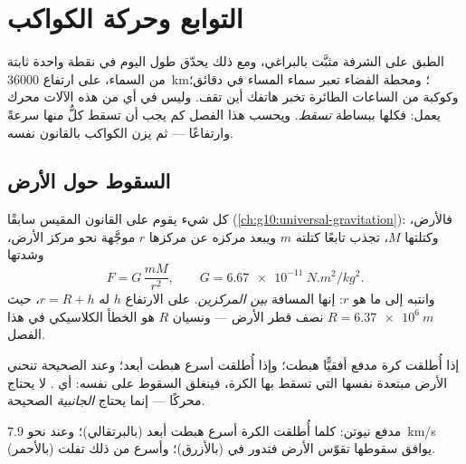 \chapter{التوابع وحركة الكواكب}\label{ch:g12:satellites-kepler}

الطبق على الشرفة مثبَّت بالبراغي، ومع ذلك يحدّق طول اليوم في نقطة
واحدة ثابتة من السماء، على ارتفاع \qty{36000}{km}؛ ومحطة الفضاء
تعبر سماء المساء في دقائق؛ وكوكبة من الساعات الطائرة
تخبر هاتفك أين تقف. وليس في أي من هذه الآلات
محرك يعمل: فكلها ببساطة \emph{تسقط}. ويحسب هذا الفصل
كم يجب أن تسقط كلٌّ منها سرعةً وارتفاعًا --- ثم يزن
الكواكب بالقانون نفسه.

\section{السقوط حول الأرض}

كل شيء يقوم على القانون المقيس سابقًا
(\cref{ch:g10:universal-gravitation}): فالأرض، وكتلتها $M$، تجذب
تابعًا كتلته $m$ ويبعد مركزه عن مركزها $r$
 موجَّهة نحو مركز الأرض، وشدتها
\[ F = G\,\frac{m M}{r^2}, \qquad G = \qty{6.67e-11}{N.m^2/kg^2}. \]
وانتبه إلى ما هو $r$: إنها المسافة \emph{بين المركزين}.  على
الارتفاع $h$ له $r = R + h$، حيث $R = \qty{6.37e6}{m}$ نصف قطر
الأرض --- ونسيان $R$ هو الخطأ الكلاسيكي في هذا الفصل.

\begin{remark}\label{rem:g12:satellites-kepler:cannon}
إذا أُطلقت كرة مدفع أفقيًّا هبطت؛ وإذا أُطلقت أسرع هبطت أبعد؛
وعند  الصحيحة تنحني الأرض مبتعدة  نفسها التي تسقط بها
الكرة، فينغلق السقوط على نفسه: أي . 
لا يحتاج محركًا --- إنما يحتاج  \emph{الجانبية} الصحيحة.
\end{remark}

\begin{omfigure}

{\small مدفع نيوتن: كلما أُطلقت الكرة أسرع هبطت أبعد
(بالبرتقالي)؛ وعند نحو \qty{7.9}{km/s} يوافق سقوطها تقوّس
الأرض فتدور في  (بالأزرق)؛ وأسرع من ذلك تفلت (بالأحمر).}
\end{omfigure}


